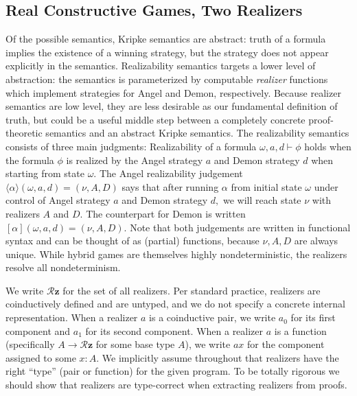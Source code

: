 \documentclass[12pt]{cmuthesis}
\theoremstyle{definition}
\theoremstyle{remark}
\begin{document}
\subsection{Real Constructive Games, Two Realizers}
\newcommand{\rzF}[2]{#1 \vdash #2}
\newcommand{\rzA}[3]{\langle{#2}\rangle(#1)=(#3)}
\newcommand{\rzD}[3]{[{#2}](#1)=(#3)}
\newcommand{\rzFst}[1]{#1_0}
\newcommand{\rzSnd}[1]{#1_1}
\newcommand{\rzThd}[1]{#1_2}
\newcommand{\rzFrt}[1]{#1_3}
\newcommand{\rzApp}[2]{#1#2}
\newcommand{\sa}{\omega}
\renewcommand{\sb}{\nu}
\newcommand{\Sc}{\mu}
\renewcommand{\aa}{a}
\newcommand{\ab}{A}
\newcommand{\ac}{\aleph}
\newcommand{\da}{d}
\newcommand{\db}{D}
\newcommand{\dc}{\delta}
\newcommand{\allRz}{\mathcal{R}\mathbf{z}}
Of the possible semantics, Kripke semantics are abstract: truth of a formula implies the existence of a winning strategy, but the strategy does not appear explicitly in the semantics.
Realizability semantics targets a lower level of abstraction: the semantics is parameterized by computable \emph{realizer} functions which implement strategies for Angel and Demon, respectively.
Because realizer semantics are low level, they are less desirable as our fundamental definition of truth, but could be a useful middle step between a completely concrete proof-theoretic semantics and an abstract Kripke semantics.
The realizability semantics consists of three main judgments:
Realizability of a formula $\rzF{\sa,\aa,\da}{\phi}$ holds when the formula $\phi$ is realized by the Angel strategy $\aa$ and Demon strategy $\da$ when starting from state $\sa$.
The Angel realizability judgement $\rzA{\sa,\aa,\da}{\alpha}{\sb,\ab,\db}$ says that after running $\alpha$ from initial state $\sa$ under control of Angel strategy $\aa$ and Demon strategy $\da,$ we will reach state $\sb$ with realizers $\ab$ and $\db$.
The counterpart for Demon is written $\rzD{\sa,\aa,\da}{\alpha}{\sb,\ab,\db}$.
Note that both judgements are written in functional syntax and can be thought of as (partial) functions, because $\sb,\ab,\db$ are always unique.
While hybrid games are themselves highly nondeterministic, the realizers resolve all nondeterminism.

We write $\allRz$ for the set of all realizers.
Per standard practice, realizers are coinductively defined and are untyped, and we do not specify a concrete internal representation.
When a realizer $\aa$ is a coinductive pair, we write $\rzFst{\aa}$ for its first component and $\rzSnd{\aa}$ for its second component.
When a realizer $\aa$ is a function (specifically $A \to \allRz$ for some base type $A$), we write $\rzApp{\aa}{x}$ for the component assigned to some $x:A$.
We implicitly assume throughout that realizers have the right ``type'' (pair or function) for the given program.
To be totally rigorous we should show that realizers are type-correct when extracting realizers from proofs.
\end{document}
